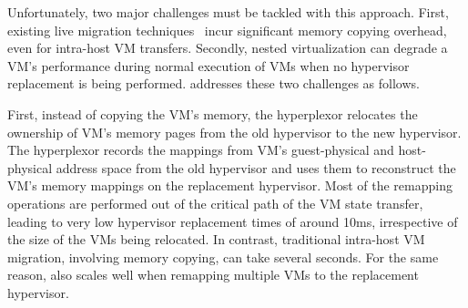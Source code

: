 Unfortunately, two major challenges must be tackled with this approach.
First, existing live migration techniques~\cite{clark2005live,postcopy} 
incur significant memory copying overhead, even for intra-host VM transfers.
Secondly, nested virtualization can degrade a VM's performance during
normal execution of VMs when no hypervisor replacement is being performed.
\arch addresses these two challenges as follows.

First, instead of copying the VM's
memory, the hyperplexor relocates the ownership 
of VM's memory pages from the old hypervisor to the 
new hypervisor.
The hyperplexor records the mappings 
from VM's guest-physical and host-physical address space 
from the old hypervisor and uses them to reconstruct the 
VM's memory mappings on the replacement hypervisor. 
Most of the remapping operations are performed out of 
the critical path of the VM state transfer,
leading to very low hypervisor replacement times
of around 10ms, irrespective of the size of
the VMs being relocated. In contrast, traditional
intra-host VM migration, involving memory copying,
can take several seconds.
For the same reason, \arch also scales
well when remapping multiple VMs to the replacement
hypervisor.




